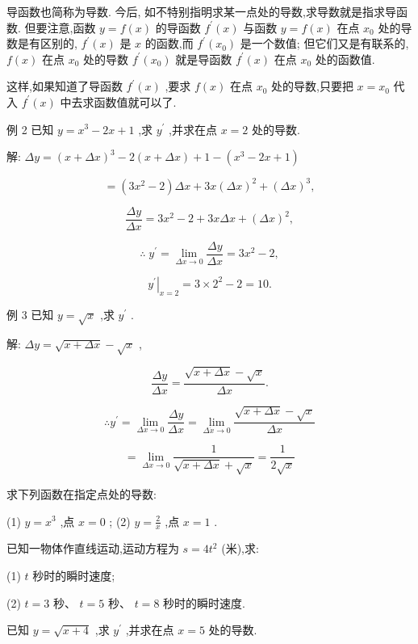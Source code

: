 \documentclass[lang=cn,newtx,12pt,scheme=chinese]{elegantbook}
\begin{document}
导函数也简称为导数. 今后, 如不特别指明求某一点处的导数,求导数就是指求导函数. 但要注意,函数 \(y = f\left( x\right)\) 的导函数 \({f}^{\prime }\left( x\right)\) 与函数 \(y = f\left( x\right)\) 在点 \({x}_{0}\) 处的导数是有区别的, \({f}^{\prime }\left( x\right)\) 是 \(x\) 的函数,而 \({f}^{\prime }\left( {x}_{0}\right)\) 是一个数值; 但它们又是有联系的, \(f\left( x\right)\) 在点 \({x}_{0}\) 处的导数 \({f}^{\prime }\left( {x}_{0}\right)\) 就是导函数 \({f}^{\prime }\left( x\right)\) 在点 \({x}_{0}\) 处的函数值.

这样,如果知道了导函数 \({f}^{\prime }\left( x\right)\) ,要求 \(f\left( x\right)\) 在点 \({x}_{0}\) 处的导数,只要把 \(x = {x}_{0}\) 代入 \({f}^{\prime }\left( x\right)\) 中去求函数值就可以了.

例 2 已知 \(y = {x}^{3} - {2x} + 1\) ,求 \({y}^{\prime }\) ,并求在点 \(x = 2\) 处的导数.

解: \({\Delta y} = {\left( x + \Delta x\right) }^{3} - 2\left( {x + {\Delta x}}\right) + 1 - \left( {{x}^{3} - {2x} + 1}\right)\)

\[
= \left( {3{x}^{2} - 2}\right) {\Delta x} + {3x}{\left( \Delta x\right) }^{2} + {\left( \Delta x\right) }^{3},
\]

\[
\frac{\Delta y}{\Delta x} = 3{x}^{2} - 2 + {3x\Delta x} + {\left( \Delta x\right) }^{2},
\]

\[
\therefore \;{y}^{\prime } = \mathop{\lim }\limits_{{{\Delta x} \rightarrow 0}}\frac{\Delta y}{\Delta x} = 3{x}^{2} - 2,
\]

\[
{\left. {y}^{\prime }\right| }_{x = 2} = 3 \times {2}^{2} - 2 = {10}.
\]

例 3 已知 \(y = \sqrt{x}\) ,求 \({y}^{\prime }\) .

解: \({\Delta y} = \sqrt{x + {\Delta x}} - \sqrt{x}\) ,

\[
\frac{\Delta y}{\Delta x} = \frac{\sqrt{x + {\Delta x}} - \sqrt{x}}{\Delta x}.
\]

\[
\therefore {y}^{\prime } = \mathop{\lim }\limits_{{{\Delta x} \rightarrow 0}}\frac{\Delta y}{\Delta x} = \mathop{\lim }\limits_{{\Delta \dot{x} \rightarrow 0}}\frac{\sqrt{x + {\Delta x}} - \sqrt{x}}{\Delta x}
\]

\[
= \mathop{\lim }\limits_{{{\Delta x} \rightarrow 0}}\frac{1}{\sqrt{x + {\Delta x}} + \sqrt{x}} = \frac{1}{2\sqrt{x}}
\]

\begin{problemset}[练习]

\item 求下列函数在指定点处的导数:

(1) \(y = {x}^{3}\) ,点 \(x = 0\) ; (2) \(y = \frac{2}{x}\) ,点 \(x = 1\) .

\item 已知一物体作直线运动,运动方程为 \(s = 4{t}^{2}\) (米),求:

(1) \(t\) 秒时的瞬时速度;

(2) \(t = 3\) 秒、 \(t = 5\) 秒、 \(t = 8\) 秒时的瞬时速度.

\item 已知 \(y = \sqrt{x + 4}\) ,求 \({y}^{\prime }\) ,并求在点 \(x = 5\) 处的导数.

\end{problemset}
\end{document}
